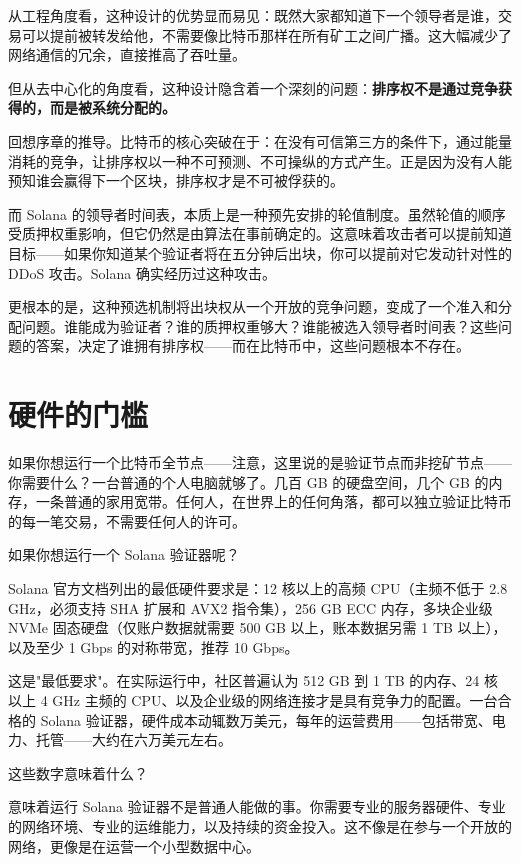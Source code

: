 \documentclass[a4paper,12pt,openany]{ctexbook}
\begin{document}
从工程角度看，这种设计的优势显而易见：既然大家都知道下一个领导者是谁，交易可以提前被转发给他，不需要像比特币那样在所有矿工之间广播。这大幅减少了网络通信的冗余，直接推高了吞吐量。

但从去中心化的角度看，这种设计隐含着一个深刻的问题：\textbf{排序权不是通过竞争获得的，而是被系统分配的。}

回想序章的推导。比特币的核心突破在于：在没有可信第三方的条件下，通过能量消耗的竞争，让排序权以一种不可预测、不可操纵的方式产生。正是因为没有人能预知谁会赢得下一个区块，排序权才是不可被俘获的。

而 Solana 的领导者时间表，本质上是一种预先安排的轮值制度。虽然轮值的顺序受质押权重影响，但它仍然是由算法在事前确定的。这意味着攻击者可以提前知道目标——如果你知道某个验证者将在五分钟后出块，你可以提前对它发动针对性的 DDoS 攻击。Solana 确实经历过这种攻击。

更根本的是，这种预选机制将出块权从一个开放的竞争问题，变成了一个准入和分配问题。谁能成为验证者？谁的质押权重够大？谁能被选入领导者时间表？这些问题的答案，决定了谁拥有排序权——而在比特币中，这些问题根本不存在。


\section*{硬件的门槛}


如果你想运行一个比特币全节点——注意，这里说的是验证节点而非挖矿节点——你需要什么？一台普通的个人电脑就够了。几百 GB 的硬盘空间，几个 GB 的内存，一条普通的家用宽带。任何人，在世界上的任何角落，都可以独立验证比特币的每一笔交易，不需要任何人的许可。

如果你想运行一个 Solana 验证器呢？

Solana 官方文档列出的最低硬件要求是：12 核以上的高频 CPU（主频不低于 2.8 GHz，必须支持 SHA 扩展和 AVX2 指令集），256 GB ECC 内存，多块企业级 NVMe 固态硬盘（仅账户数据就需要 500 GB 以上，账本数据另需 1 TB 以上），以及至少 1 Gbps 的对称带宽，推荐 10 Gbps。

这是"最低要求"。在实际运行中，社区普遍认为 512 GB 到 1 TB 的内存、24 核以上 4 GHz 主频的 CPU、以及企业级的网络连接才是具有竞争力的配置。一台合格的 Solana 验证器，硬件成本动辄数万美元，每年的运营费用——包括带宽、电力、托管——大约在六万美元左右。

这些数字意味着什么？

意味着运行 Solana 验证器不是普通人能做的事。你需要专业的服务器硬件、专业的网络环境、专业的运维能力，以及持续的资金投入。这不像是在参与一个开放的网络，更像是在运营一个小型数据中心。
\end{document}
